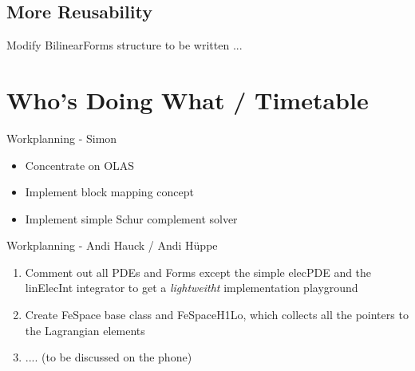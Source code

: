 \documentclass[10pt]{beamer}
\begin{document}
\subsection{More Reusability}
\begin{frame}{Modify BilinearForms structure}
 to be written ...
\end{frame}

\section{Who's Doing What / Timetable}
\begin{frame}{Workplanning - Simon}
\begin{itemize}
 \item Concentrate on OLAS
\item Implement block mapping concept
\item Implement simple Schur complement solver
\end{itemize}
\end{frame}

\begin{frame}{Workplanning - Andi Hauck / Andi Hüppe}
\begin{enumerate}
 \item Comment out all PDEs and Forms except the simple elecPDE and the
linElecInt integrator to get a \emph{lightweitht} implementation playground
 \item Create FeSpace base class and FeSpaceH1Lo, which collects all the
pointers to the Lagrangian elements
\item .... (to be discussed on the phone)
\end{enumerate}
\end{frame}



\end{document}
